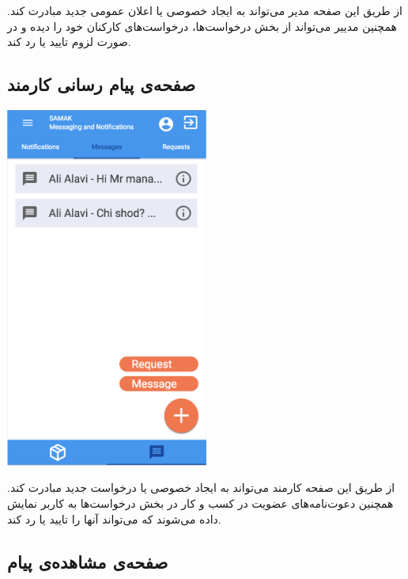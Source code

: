 از طریق این صفحه مدیر می‌تواند به ایجاد خصوصی یا اعلان عمومی جدید مبادرت کند. همچنین مدییر می‌تواند از بخش درخواست‌ها، درخواست‌های کارکنان خود را دیده و در صورت لزوم تایید یا رد کند.



\subsection{صفحه‌ی پیام رسانی کارمند}


\begin{center}
\includegraphics[width = 0.5\textwidth]{images/17-messaging-employee.png}
\end{center}

از طریق این صفحه کارمند می‌تواند به ایجاد خصوصی یا درخواست جدید مبادرت کند. همچنین دعوت‌نامه‌های عضویت در کسب و کار در بخش درخواست‌ها به کاربر نمایش داده می‌شوند که می‌تواند آنها را تایید یا رد کند.

\subsection{صفحه‌ی مشاهده‌ی پیام}

